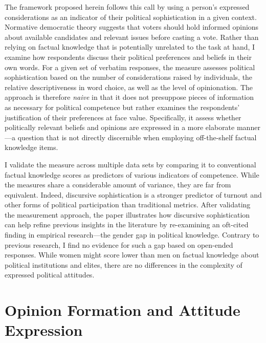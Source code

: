 The framework proposed herein follows this call by using a person's expressed considerations as an indicator of their political sophistication in a given context. Normative democratic theory suggests that voters should hold informed opinions about available candidates and relevant issues before casting a vote. Rather than relying on factual knowledge that is potentially unrelated to the task at hand, I examine how respondents discuss their political preferences and beliefs in their own words. For a given set of verbatim responses, the measure assesses political sophistication based on the number of considerations raised by individuals, the relative descriptiveness in word choice, as well as the level of opinionation. The approach is therefore \textit{naive} in that it does not presuppose pieces of information as necessary for political competence but rather examines the respondents' justification of their preferences at face value. Specifically, it assess whether politically relevant beliefs and opinions are expressed in a more elaborate manner---a question that is not directly discernible when employing off-the-shelf factual knowledge items. 

I validate the measure across multiple data sets by comparing it to conventional factual knowledge scores as predictors of various indicators of competence. While the measures share a considerable amount of variance, they are far from equivalent. Indeed, discursive sophistication is a stronger predictor of turnout and other forms of political participation than traditional metrics. After validating the measurement approach, the paper illustrates how discursive sophistication can help refine previous insights in the literature by re-examining an oft-cited finding in empirical research---the gender gap in political knowledge. Contrary to previous research, I find no evidence for such a gap based on open-ended responses. While women might score lower than men on factual knowledge about political institutions and elites, there are no differences in the complexity of expressed political attitudes.



\section*{Opinion Formation and Attitude Expression}

